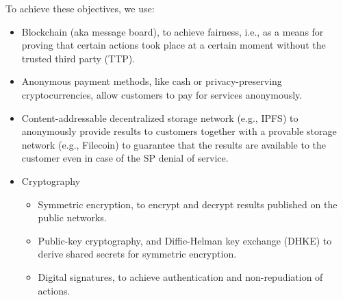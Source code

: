 To achieve these objectives, we use:
\begin{itemize}
    \item Blockchain (aka message board), to achieve fairness, i.e., as a means for proving that certain actions took place at a certain moment without the trusted third party (TTP).
    \item Anonymous payment methods, like cash or privacy-preserving cryptocurrencies, allow customers to pay for services anonymously.
    \item Content-addressable decentralized storage network (e.g., IPFS) to anonymously provide results to customers together with a provable storage network (e.g., Filecoin) to guarantee that the results are available to the customer even in case of the SP denial of service. 
    \item Cryptography
    \begin{itemize}
        \item Symmetric encryption, to encrypt and decrypt results published on the public networks.
        \item Public-key cryptography, and Diffie-Helman key exchange (DHKE) to derive shared secrets for symmetric encryption.
        \item Digital signatures, to achieve authentication and non-repudiation of actions. 
    \end{itemize}
    
\end{itemize}


